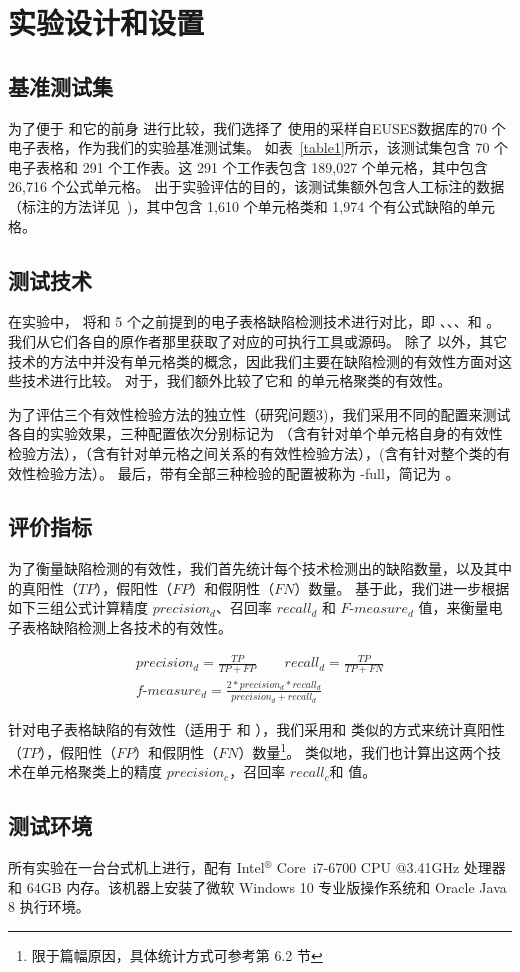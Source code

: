 \section{实验设计和设置}


\subsection{基准测试集} 
为了便于 \wa 和它的前身 \cu 进行比较，我们选择了 \cu 使用的采样自EUSES数据库的70 个电子表格，作为我们的实验基准测试集。
如表~\ref{table1}所示，该测试集包含 70 个电子表格和 291 个工作表。这 291 个工作表包含 189,027 个单元格，其中包含 26,716 个公式单元格。
出于实验评估的目的，该测试集额外包含人工标注的数据（标注的方法详见~\cite{cheung2016custodes})，其中包含 1,610 个单元格类和 1,974 个有公式缺陷的单元格。

\subsection{测试技术} 
在实验中， \wa 将和 5 个之前提到的电子表格缺陷检测技术进行对比，即 \uc、\di、\am、\ca 和 \cu 。
我们从它们各自的原作者那里获取了对应的可执行工具或源码。
除了 \ca 以外，其它技术的方法中并没有单元格类的概念，因此我们主要在缺陷检测的有效性方面对这些技术进行比较。
对于\ca，我们额外比较了它和 \wa 的单元格聚类的有效性。

为了评估三个有效性检验方法的独立性（研究问题3)，我们采用不同的配置来测试各自的实验效果，三种配置依次分别标记为 \wasc （含有针对单个单元格自身的有效性检验方法），\wamc （含有针对单元格之间关系的有效性检验方法），\wawc (含有针对整个类的有效性检验方法）。
最后，带有全部三种检验的配置被称为 \wa-full，简记为 \wa 。

\subsection{评价指标} 
为了衡量缺陷检测的有效性，我们首先统计每个技术检测出的缺陷数量，以及其中的真阳性（$TP$），假阳性（$FP$）和假阴性（$FN$）数量。
基于此，我们进一步根据如下三组公式计算精度 $precision_d$、召回率 $recall_d$ 和 $F\text{-}measure_d$ 值\cite{yoshida2010person}，来衡量电子表格缺陷检测上各技术的有效性。

\begin{gather*}
    precision_d=\frac{TP}{TP + FP}\qquad recall_d = \frac{TP}{TP + FN}\\
    f\text{-}measure_d = \frac{2 * precision_d * recall_d}{precision_d + recall_d}
\end{gather*}

针对电子表格缺陷的有效性（适用于 \wa 和 \cu），我们采用和 \cu 类似的方式来统计真阳性（$TP$），假阳性（$FP$）和假阴性（$FN$）数量\footnote{限于篇幅原因，具体统计方式可参考\cite{cheung2016custodes}第 6.2 节}。
类似地，我们也计算出这两个技术在单元格聚类上的精度 $precision_c$，召回率 $recall_c$和 \fmc 值。

\subsection{测试环境} 
所有实验在一台台式机上进行，配有 Intel$^\circledR$ Core\texttrademark\ i7-6700 CPU @3.41GHz 处理器和 64GB 内存。该机器上安装了微软 Windows 10 专业版操作系统和 Oracle Java 8 执行环境。

